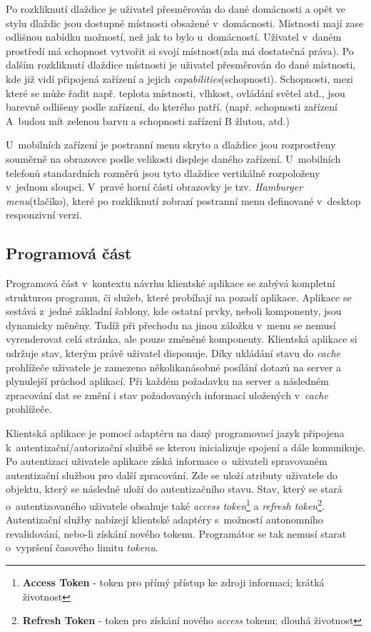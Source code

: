 Po rozkliknutí dlaždice je uživatel přesměrován do dané domácnosti a opět ve stylu dlaždic jsou dostupné místnosti obsažené v~domácnosti.
Místnosti mají zase odlišnou nabídku možností, než jak to bylo u~domácností.
Uživatel v~daném prostředí má schopnost vytvořit si svojí místnost(zda má dostatečná práva).
Po dalším rozkliknutí dlaždice místnosti je uživatel přesměrován do dané místnosti, kde již vidí připojená zařízení a jejich \emph{capabilities}(schopnosti).
Schopnosti, mezi které se může řadit např. teplota místnosti, vlhkost, ovládání světel atd., jsou barevně odlišeny podle zařízení, do kterého patří. (např. schopnosti zařízení A~budou mít zelenou barvu a schopnosti zařízení B žlutou, atd.)

U~mobilních zařízení je postranní menu skryto a dlaždice jsou rozprostřeny souměrně na obrazovce podle velikosti displeje daného zařízení.
U~mobilních telefonů standardních rozměrů jsou tyto dlaždice vertikálně rozpoloženy v~jednom sloupci.
V~pravé horní části obrazovky je tzv. \emph{Hamburger menu}(tlačíko), které po rozkliknutí zobrazí postranní menu definované v~desktop responzivní verzi.

\subsection*{Programová část}
\label{frontend:program}
Programová část v~kontextu návrhu klientské aplikace se zabývá kompletní strukturou programu, či služeb, které probíhají na pozadí aplikace.
Aplikace se sestává z~jedné základní šablony, kde ostatní prvky, neboli komponenty, jsou dynamicky měněny.
Tudíž při přechodu na jinou záložku v~menu se nemusí vyrenderovat celá stránka, ale pouze změněné komponenty.
Klientská aplikace si udržuje stav, kterým právě uživatel disponuje.
Díky ukládání stavu do \emph{cache} prohlížeče uživatele je zamezeno několikanásobné posílání dotazů na server a plynulejší průchod aplikací.
Při každém požadavku na server a následném zpracování dat se změní i stav požadovaných informací uložených v~\emph{cache} prohlížeče.

Klientská aplikace je pomocí adaptéru na daný programovací jazyk připojena k~autentizační/autorizační službě se kterou inicializuje spojení a dále komunikuje.
Po autentizaci uživatele aplikace získá informace o~uživateli spravovaném autentizační službou pro další zpracování.
Zde se uloží atributy uživatele do objektu, který se následně uloží do autentizačního stavu.
Stav, který se stará o~autentizovaného uživatele obsahuje také \emph{access token}\footnote{\textbf{Access Token} - token pro přímý přístup ke zdroji informací; krátká životnost} a \emph{refresh token}\footnote{\textbf{Refresh Token} - token pro získání nového \emph{access} tokenu; dlouhá životnost}.
Autentizační služby nabízejí klientské adaptéry s~možností autonomního revalidování, nebo-li získání nového tokenu.
Programátor se tak nemusí starat o~vypršení časového limitu \emph{tokenu}.

